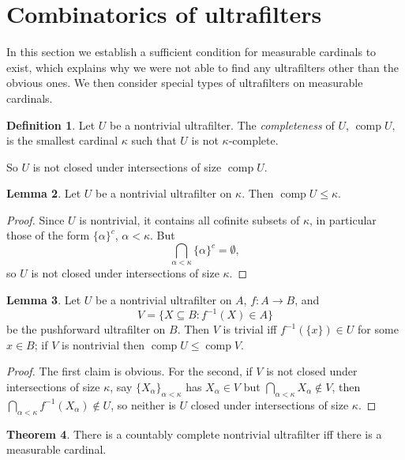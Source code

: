 \documentclass[12pt]{report}
\DeclareMathOperator{\comp}{comp}
\newcommand{\dfn}[1]{\emph{#1}\index{#1}}
\theoremstyle{definition}
\newtheorem{theorem}{Theorem}[chapter]
\newtheorem{lemma}[theorem]{Lemma}
\newtheorem{definition}[theorem]{Definition}
\begin{document}
\section{Combinatorics of ultrafilters}
In this section we establish a sufficient condition for measurable cardinals to exist, which explains why we were not able to find any ultrafilters other than the obvious ones.
We then consider special types of ultrafilters on measurable cardinals.
\begin{definition}
Let $U$ be a nontrivial ultrafilter. The \dfn{completeness} of $U$, $\comp U$, is the smallest cardinal $\kappa$ such that $U$ is not $\kappa$-complete.
\end{definition}
So $U$ is not closed under intersections of size $\comp U$.
\begin{lemma}
Let $U$ be a nontrivial ultrafilter on $\kappa$. Then $\comp U \leq \kappa$.
\end{lemma}
\begin{proof}
Since $U$ is nontrivial, it contains all cofinite subsets of $\kappa$, in particular those of the form $\{\alpha\}^c$, $\alpha < \kappa$. But
$$\bigcap_{\alpha < \kappa} \{\alpha\}^c = \emptyset,$$
so $U$ is not closed under intersections of size $\kappa$.
\end{proof}
\begin{lemma}
Let $U$ be a nontrivial ultrafilter on $A$, $f: A \to B$, and
$$V = \{X \subseteq B: f^{-1}(X) \in A\}$$
be the pushforward ultrafilter on $B$. Then $V$ is trivial iff $f^{-1}(\{x\}) \in U$ for some $x \in B$; if $V$ is nontrivial then $\comp U \leq \comp V$.
\end{lemma}
\begin{proof}
The first claim is obvious. For the second, if $V$ is not closed under intersections of size $\kappa$, say $\{X_\alpha\}_{\alpha < \kappa}$ has $X_\alpha \in V$ but $\bigcap_{\alpha < \kappa} X_\alpha \notin V$, then $\bigcap_{\alpha < \kappa} f^{-1}(X_\alpha) \notin U$, so neither is $U$ closed under intersections of size $\kappa$.
\end{proof}
\begin{theorem}
There is a countably complete nontrivial ultrafilter iff there is a measurable cardinal.
\end{theorem}
\end{document}

